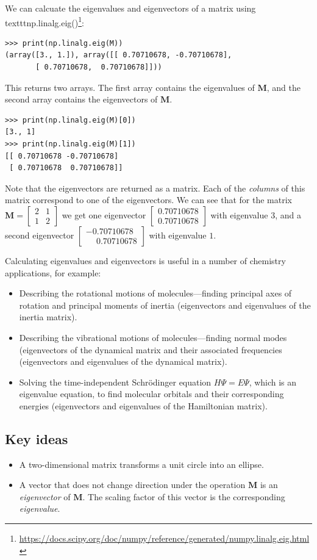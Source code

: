 \documentclass[a4paper]{article}
\newcommand{\bvec}[1]{\boldsymbol{\mathbf{#1}}}
\newcommand{\cvec}[2]{\begin{bmatrix}#1\\#2\end{bmatrix}}
\newcommand{\tmatrix}[4]{\begin{bmatrix}#1&#2\\#3&#4\end{bmatrix}}
\begin{document}
We can calcuate the eigenvalues and eigenvectors of a matrix using texttt{np.linalg.eig()}\footnote{\url{https://docs.scipy.org/doc/numpy/reference/generated/numpy.linalg.eig.html}}:
\begin{lstlisting}
>>> print(np.linalg.eig(M))
(array([3., 1.]), array([[ 0.70710678, -0.70710678],
       [ 0.70710678,  0.70710678]]))
\end{lstlisting}
This returns two arrays. The first array contains the eigenvalues of $\bvec{M}$, and the second array contains the eigenvectors of $\bvec{M}$.
\begin{lstlisting}
>>> print(np.linalg.eig(M)[0])
[3., 1]
>>> print(np.linalg.eig(M)[1])
[[ 0.70710678 -0.70710678]
 [ 0.70710678  0.70710678]]
\end{lstlisting}
Note that the eigenvectors are returned as a matrix. Each of the \emph{columns} of this matrix correspond to one of the eigenvectors. We can see that for the matrix $\bvec{M}=\tmatrix{2}{1}{1}{2}$ we get one eigenvector $\cvec{0.70710678}{0.70710678}$ with eigenvalue $3$, and a second eigenvector $\cvec{-0.70710678}{\phantom{-}0.70710678}$ with eigenvalue $1$.

Calculating eigenvalues and eigenvectors is useful in a number of chemistry applications, for example:
\begin{itemize}
 \item Describing the rotational motions of molecules---finding principal axes of rotation and principal moments of inertia (eigenvectors and eigenvalues of the inertia matrix).
 \item Describing the vibrational motions of molecules---finding normal modes (eigenvectors of the dynamical matrix and their associated frequencies (eigenvectors and eigenvalues of the dynamical matrix).
 \item Solving the time-independent Schr\"{o}dinger equation $H\Psi=E\Psi$, which is an eigenvalue equation, to find molecular orbitals and their corresponding energies (eigenvectors and eigenvalues of the Hamiltonian matrix).
\end{itemize}

\subsection{Key ideas}
\begin{itemize}
  \item A two-dimensional matrix transforms a unit circle into an ellipse.
  \item A vector that does not change direction under the operation $\bvec{M}$ is an \emph{eigenvector} of $\bvec{M}$. The scaling factor of this vector is the corresponding \emph{eigenvalue}.
\end{itemize}
\end{document}
